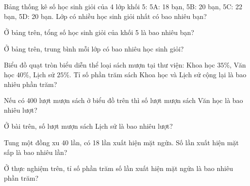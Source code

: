 
\begin{ex}
  Bảng thống kê số học sinh giỏi của 4 lớp khối 5: 5A: 18 bạn, 5B: 20 bạn, 5C: 22 bạn, 5D: 20 bạn. Lớp có nhiều học sinh giỏi nhất có bao nhiêu bạn?
\end{ex}

\begin{ex}
  Ở bảng trên, tổng số học sinh giỏi của khối 5 là bao nhiêu bạn?
\end{ex}

\begin{ex}
  Ở bảng trên, trung bình mỗi lớp có bao nhiêu học sinh giỏi?
\end{ex}

\begin{ex}
  Biểu đồ quạt tròn biểu diễn thể loại sách mượn tại thư viện: Khoa học $35\%$, Văn học $40\%$, Lịch sử $25\%$. Tỉ số phần trăm sách Khoa học và Lịch sử cộng lại là bao nhiêu phần trăm?
\end{ex}

\begin{ex}
  Nếu có 400 lượt mượn sách ở biểu đồ trên thì số lượt mượn sách Văn học là bao nhiêu lượt?
\end{ex}

\begin{ex}
  Ở bài trên, số lượt mượn sách Lịch sử là bao nhiêu lượt?
\end{ex}

\begin{ex}
  Tung một đồng xu 40 lần, có 18 lần xuất hiện mặt ngửa. Số lần xuất hiện mặt sấp là bao nhiêu lần?
\end{ex}

\begin{ex}
  Ở thực nghiệm trên, tỉ số phần trăm số lần xuất hiện mặt ngửa là bao nhiêu phần trăm?
\end{ex}

